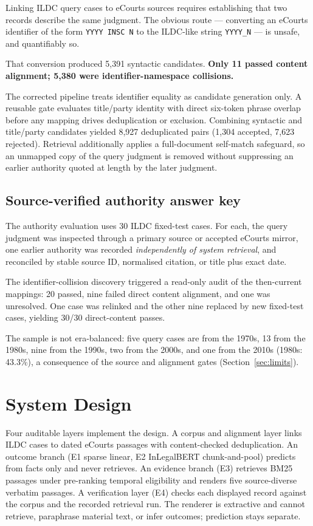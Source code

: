 \documentclass[conference]{IEEEtran}
\begin{document}
Linking ILDC query cases to eCourts sources requires establishing that two
records describe the same judgment. The obvious route --- converting an eCourts
identifier of the form \texttt{YYYY INSC N} to the ILDC-like string
\texttt{YYYY\_N} --- is unsafe, and quantifiably so.

That conversion produced 5{,}391 syntactic candidates. \textbf{Only 11 passed
content alignment; 5{,}380 were identifier-namespace collisions.}

The corrected pipeline treats identifier equality as candidate generation only.
A reusable gate evaluates title/party identity with direct six-token
phrase overlap before any mapping drives deduplication or
exclusion. Combining syntactic and title/party candidates yielded 8{,}927
deduplicated pairs (1{,}304 accepted, 7{,}623 rejected).
Retrieval additionally applies a full-document self-match safeguard, so an
unmapped copy of the query judgment is removed without suppressing an
earlier authority quoted at length by the later judgment.

\subsection{Source-verified authority answer key}

The authority evaluation uses 30 ILDC fixed-test cases. For each, the query
judgment was inspected through a primary source or accepted eCourts mirror, one
earlier authority was recorded \emph{independently of system retrieval}, and
reconciled by stable source ID, normalised
citation, or title plus exact date.

The identifier-collision discovery triggered a read-only audit of the
then-current mappings: 20 passed, nine failed direct content
alignment, and one was unresolved. One case was relinked
and the other nine replaced by new
fixed-test cases, yielding 30/30 direct-content passes.

The sample is not era-balanced: five query cases are from the 1970s, 13 from the
1980s, nine from the 1990s, two from the 2000s, and one from the 2010s
(1980s: 43.3\%), a consequence of the source and
alignment gates (Section~\ref{sec:limits}).


\section{System Design}

Four auditable layers implement the design. A corpus and alignment layer links
ILDC cases to dated eCourts passages with content-checked deduplication. An
outcome branch (E1 sparse linear, E2 InLegalBERT chunk-and-pool) predicts from
facts only and never retrieves. An evidence branch (E3) retrieves BM25 passages
under pre-ranking temporal eligibility and renders five source-diverse verbatim
passages. A verification layer (E4) checks each displayed record against the
corpus and the recorded retrieval run. The renderer is extractive and cannot
retrieve, paraphrase material text, or infer outcomes; prediction stays separate.
\end{document}
